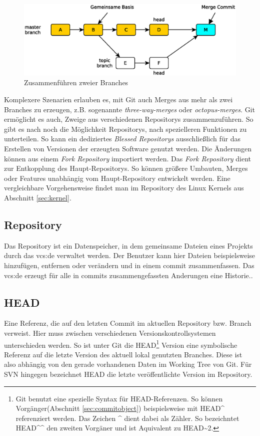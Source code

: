 \begin{figure}[hb]
  \centering
  \includegraphics[scale=0.60]{images/merge.eps}
  \caption{Zusammenführen zweier Branches}
  \label{fig:merge}
\end{figure}

Komplexere Szenarien erlauben es, mit Git auch Merges aus mehr als zwei
Branches zu erzeugen, z.B. sogenannte \textit{three-way-merges} oder
\textit{octopus-merges}\cite[S.~87]{gitosp}. Git ermöglicht es auch, Zweige aus
verschiedenen Repositorys zusammenzuführen. So gibt es nach \cite[3]{gitwf}
noch die Möglichkeit Repositorys, nach spezielleren Funktionen zu unterteilen.
So kann ein dediziertes \textit{Blessed Repositorys} ausschließlich für das
Erstellen von Versionen der erzeugten Software genutzt werden. Die Änderungen
können aus einem \textit{Fork Repository} importiert werden. Das \textit{Fork
Repository} dient zur Entkopplung des Haupt-Repositorys. So können größere
Umbauten, Merges oder Features unabhängig vom Haupt-Repository entwickelt
werden\cite[S.~123]{gitwf}. Eine vergleichbare Vorgehensweise findet man im
Repository des Linux Kernels\cite{link:linuxgit} aus Abschnitt \ref{sec:kernel}.

\subsection{Repository}\label{sec:repository}
Das Repository ist ein Datenspeicher, in dem gemeinsame Dateien eines Projekts
durch das \acrlong{vcs:de} verwaltet werden. Der Benutzer kann hier Dateien
beispielsweise hinzufügen, entfernen oder verändern und in einem \gls{commit}
zusammenfassen. Das \acrlong{vcs:de} erzeugt für alle in \glspl{commit}
zusammengefassten Anderungen eine Historie.\cite[S.~38]{hagen:1678}.

\subsection{HEAD}\label{sec:head}
Eine Referenz, die auf den letzten Commit im aktuellen Repository bzw. Branch
verweist. Hier muss zwischen verschiedenen Versionskontrollsystemen
unterschieden werden. So ist unter Git die HEAD\footnote{Git benutzt eine
spezielle Syntax für HEAD-Referenzen. So können Vorgänger(Abschnitt
\ref{sec:commitobject}) beispielsweise mit HEAD\^{} referenziert werden. Das
Zeichen \^{} dient dabei als Zähler. So bezeichntet HEAD\^{}\^{} den zweiten Vorgäner und
ist Aquivalent zu HEAD\~{}2.\cite[S.~65]{gitosp}} Version eine symbolische
Referenz auf die letzte Version des aktuell lokal genutzten Branches. Diese ist
also abhängig von den gerade vorhandenen Daten im Working Tree von
Git\cite[S.~20]{gitosp}. Für SVN hingegen bezeichnet HEAD die letzte
veröffentlichte Version im Repository.

